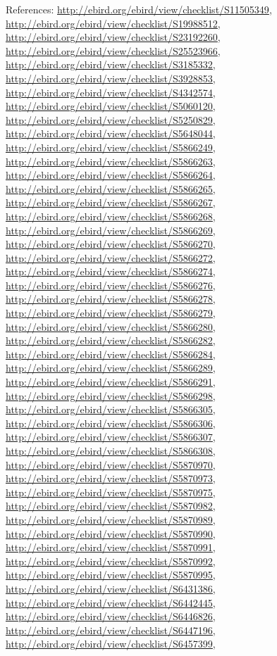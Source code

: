 \documentclass[9pt, article]{memoir}
\begin{document}
\begin{multicols}{2}
References: 
\url{http://ebird.org/ebird/view/checklist/S11505349}, 
\url{http://ebird.org/ebird/view/checklist/S19988512}, 
\url{http://ebird.org/ebird/view/checklist/S23192260}, 
\url{http://ebird.org/ebird/view/checklist/S25523966}, 
\url{http://ebird.org/ebird/view/checklist/S3185332}, 
\url{http://ebird.org/ebird/view/checklist/S3928853}, 
\url{http://ebird.org/ebird/view/checklist/S4342574}, 
\url{http://ebird.org/ebird/view/checklist/S5060120}, 
\url{http://ebird.org/ebird/view/checklist/S5250829}, 
\url{http://ebird.org/ebird/view/checklist/S5648044}, 
\url{http://ebird.org/ebird/view/checklist/S5866249}, 
\url{http://ebird.org/ebird/view/checklist/S5866263}, 
\url{http://ebird.org/ebird/view/checklist/S5866264}, 
\url{http://ebird.org/ebird/view/checklist/S5866265}, 
\url{http://ebird.org/ebird/view/checklist/S5866267}, 
\url{http://ebird.org/ebird/view/checklist/S5866268}, 
\url{http://ebird.org/ebird/view/checklist/S5866269}, 
\url{http://ebird.org/ebird/view/checklist/S5866270}, 
\url{http://ebird.org/ebird/view/checklist/S5866272}, 
\url{http://ebird.org/ebird/view/checklist/S5866274}, 
\url{http://ebird.org/ebird/view/checklist/S5866276}, 
\url{http://ebird.org/ebird/view/checklist/S5866278}, 
\url{http://ebird.org/ebird/view/checklist/S5866279}, 
\url{http://ebird.org/ebird/view/checklist/S5866280}, 
\url{http://ebird.org/ebird/view/checklist/S5866282}, 
\url{http://ebird.org/ebird/view/checklist/S5866284}, 
\url{http://ebird.org/ebird/view/checklist/S5866289}, 
\url{http://ebird.org/ebird/view/checklist/S5866291}, 
\url{http://ebird.org/ebird/view/checklist/S5866298}, 
\url{http://ebird.org/ebird/view/checklist/S5866305}, 
\url{http://ebird.org/ebird/view/checklist/S5866306}, 
\url{http://ebird.org/ebird/view/checklist/S5866307}, 
\url{http://ebird.org/ebird/view/checklist/S5866308}, 
\url{http://ebird.org/ebird/view/checklist/S5870970}, 
\url{http://ebird.org/ebird/view/checklist/S5870973}, 
\url{http://ebird.org/ebird/view/checklist/S5870975}, 
\url{http://ebird.org/ebird/view/checklist/S5870982}, 
\url{http://ebird.org/ebird/view/checklist/S5870989}, 
\url{http://ebird.org/ebird/view/checklist/S5870990}, 
\url{http://ebird.org/ebird/view/checklist/S5870991}, 
\url{http://ebird.org/ebird/view/checklist/S5870992}, 
\url{http://ebird.org/ebird/view/checklist/S5870995}, 
\url{http://ebird.org/ebird/view/checklist/S6431386}, 
\url{http://ebird.org/ebird/view/checklist/S6442445}, 
\url{http://ebird.org/ebird/view/checklist/S6446826}, 
\url{http://ebird.org/ebird/view/checklist/S6447196}, 
\url{http://ebird.org/ebird/view/checklist/S6457399}, 

\end{multicols}
\end{document}
